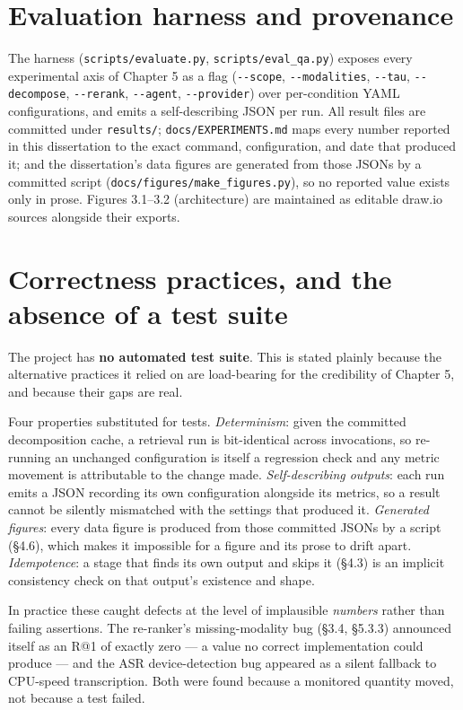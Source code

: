 \section{Evaluation harness and
provenance}

The harness (\texttt{scripts/evaluate.py}, \texttt{scripts/eval\_qa.py})
exposes every experimental axis of Chapter 5 as a flag
(\texttt{-\/-scope}, \texttt{-\/-modalities}, \texttt{-\/-tau},
\texttt{-\/-decompose}, \texttt{-\/-rerank}, \texttt{-\/-agent},
\texttt{-\/-provider}) over per-condition YAML configurations, and emits
a self-describing JSON per run. All result files are committed under
\texttt{results/}; \texttt{docs/EXPERIMENTS.md} maps every number
reported in this dissertation to the exact command, configuration, and
date that produced it; and the dissertation's data figures are generated
from those JSONs by a committed script
(\texttt{docs/figures/make\_figures.py}), so no reported value exists
only in prose. Figures 3.1--3.2 (architecture) are maintained as
editable draw.io sources alongside their exports.

\section{Correctness practices, and the absence of a test
suite}

The project has \textbf{no automated test suite}. This is stated plainly
because the alternative practices it relied on are load-bearing for the
credibility of Chapter 5, and because their gaps are real.

Four properties substituted for tests. \emph{Determinism}: given the
committed decomposition cache, a retrieval run is bit-identical across
invocations, so re-running an unchanged configuration is itself a
regression check and any metric movement is attributable to the change
made. \emph{Self-describing outputs}: each run emits a JSON recording
its own configuration alongside its metrics, so a result cannot be
silently mismatched with the settings that produced it. \emph{Generated
figures}: every data figure is produced from those committed JSONs by a
script (§4.6), which makes it impossible for a figure and its prose to
drift apart. \emph{Idempotence}: a stage that finds its own output and
skips it (§4.3) is an implicit consistency check on that output's
existence and shape.

In practice these caught defects at the level of implausible
\emph{numbers} rather than failing assertions. The re-ranker's
missing-modality bug (§3.4, §5.3.3) announced itself as an R@1 of
exactly zero --- a value no correct implementation could produce --- and
the ASR device-detection bug appeared as a silent fallback to CPU-speed
transcription. Both were found because a monitored quantity moved, not
because a test failed.

